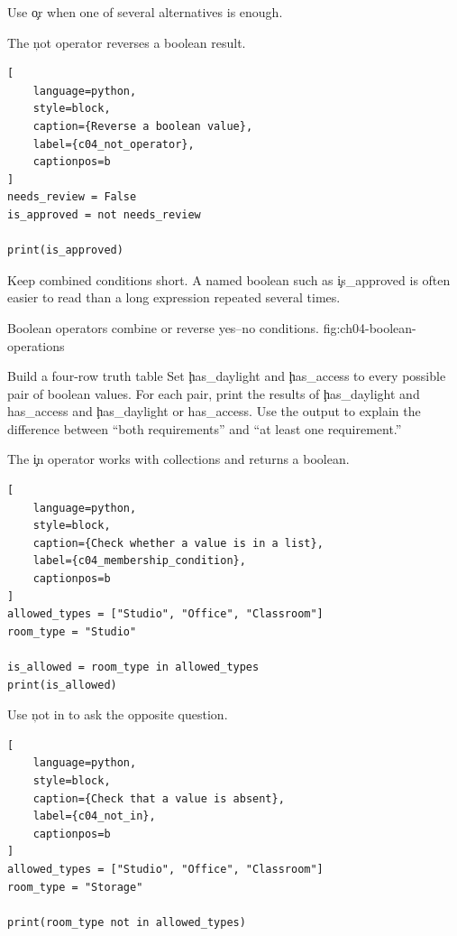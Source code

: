 Use \c{or} when one of several alternatives is enough.


The \c{not} operator reverses a boolean result.

\begin{lstlisting}[
    language=python,
    style=block,
    caption={Reverse a boolean value},
    label={c04_not_operator},
    captionpos=b
]
needs_review = False
is_approved = not needs_review

print(is_approved)
\end{lstlisting}

Keep combined conditions short. A named boolean such as \c{is_approved} is
often easier to read than a long expression repeated several times.

{Boolean operators combine or reverse yes--no conditions.}
{fig:ch04-boolean-operations}

\begin{TryBox}{Build a four-row truth table}
Set \c{has_daylight} and \c{has_access} to every possible pair of boolean
values. For each pair, print the results of \c{has_daylight and has_access}
and \c{has_daylight or has_access}. Use the output to explain the difference
between ``both requirements'' and ``at least one requirement.''
\end{TryBox}


The \c{in} operator works with collections and returns a boolean.

\begin{lstlisting}[
    language=python,
    style=block,
    caption={Check whether a value is in a list},
    label={c04_membership_condition},
    captionpos=b
]
allowed_types = ["Studio", "Office", "Classroom"]
room_type = "Studio"

is_allowed = room_type in allowed_types
print(is_allowed)
\end{lstlisting}

Use \c{not in} to ask the opposite question.

\begin{lstlisting}[
    language=python,
    style=block,
    caption={Check that a value is absent},
    label={c04_not_in},
    captionpos=b
]
allowed_types = ["Studio", "Office", "Classroom"]
room_type = "Storage"

print(room_type not in allowed_types)
\end{lstlisting}

